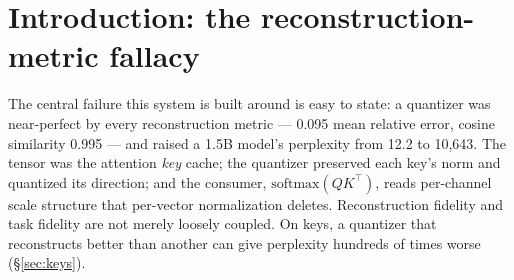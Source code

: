 \documentclass[11pt]{article}
\begin{document}
\begin{abstract}
{diagnostic} (concentration $\times$ correlation) with a ZCA-whitened third family
and adaptive per-domain selection, its single-statistic shortcut pre-registered
and refuted.
\textbf{(C4) Boundaries and method}: the measured (A2) boundary for MoE routing
(carried by the selection margin, not the logit magnitude) and state-space decay
(a log-time-constant basis cutting real-Mamba perplexity from $10^{10}$ to
near-baseline); two empirical laws with their boundaries (a density-quotient
dissociation confirmed out-of-sample; a spectral bit-tapering boundary that
honestly reversed on public data); and a methodology in which every production
incident becomes an installed instrument, every claim carries an evidence level,
and negatives are published next to the wins they bound. C2.1 is the engineering
face of the companion theory's consumer-relative flip, now demonstrated across
twelve domains and three physics: reconstruction and downstream fidelity
dissociate, so the target is what the consumer reads, not what it reconstructs.
\end{abstract}

\section{Introduction: the reconstruction-metric fallacy}\label{sec:intro}
The central failure this system is built around is easy to state: a quantizer
was near-perfect by every reconstruction metric --- 0.095 mean relative error,
cosine similarity 0.995 --- and raised a 1.5B model's perplexity from 12.2 to
10{,}643. The tensor was the attention \emph{key} cache; the quantizer
preserved each key's norm and quantized its direction; and the consumer,
$\mathrm{softmax}(QK^{\top})$, reads per-channel scale structure that
per-vector normalization deletes. Reconstruction fidelity and task fidelity
are not merely loosely coupled. On keys, a quantizer that reconstructs better
than another can give perplexity hundreds of times worse (\S\ref{sec:keys}).
\end{document}
